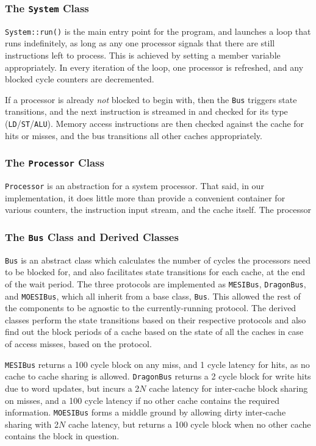 \documentclass[date,tikzlibs,lmodern,10pt]{epreport}
\begin{document}
\subsubsection{The \texttt{System} Class}
\texttt{System::run()} is the main entry point for the program, and launches a loop that runs indefinitely, as long as any one processor signals that there are still instructions left to process.
This is achieved by setting a member variable appropriately.
In every iteration of the loop, one processor is refreshed, and any blocked cycle counters are decremented.

If a processor is already \emph{not} blocked to begin with, then the \texttt{Bus} triggers state transitions, and the next instruction is streamed in and checked for its type (\texttt{LD}/\texttt{ST}/\texttt{ALU}).
Memory access instructions are then checked against the cache for hits or misses, and the bus transitions all other caches appropriately.

\subsubsection{The \texttt{Processor} Class}
\texttt{Processor} is an abstraction for a system processor. That said, in our implementation, it does little more than provide a convenient container for various counters, the instruction input stream, and the cache itself. The processor

\subsubsection{The \texttt{Bus} Class and Derived Classes}
\texttt{Bus} is an abstract class which calculates the number of cycles the processors need to be blocked for, and also facilitates state transitions for each cache, at the end of the wait period.
The three protocols are implemented as \texttt{MESIBus}, \texttt{DragonBus}, and \texttt{MOESIBus}, which all inherit from a base class, \texttt{Bus}.
This allowed the rest of the components to be agnostic to the currently-running protocol. The derived classes
perform the state transitions based on their respective protocols and also find out the block periods of a cache based on the state of all the caches in case of access misses, based on the protocol.

\texttt{MESIBus} returns a 100 cycle block on any miss, and 1 cycle latency for hits, as no cache to cache sharing is allowed.
\texttt{DragonBus} returns a 2 cycle block for write hits due to word updates, but incurs a 2\(N\) cache latency
for inter-cache block sharing on misses, and a 100 cycle latency if no other cache contains the required information.
\texttt{MOESIBus} forms a middle ground by allowing dirty inter-cache sharing with 2\(N\) cache latency, but returns a 100 cycle block when no other cache contains the block in question.
\end{document}
